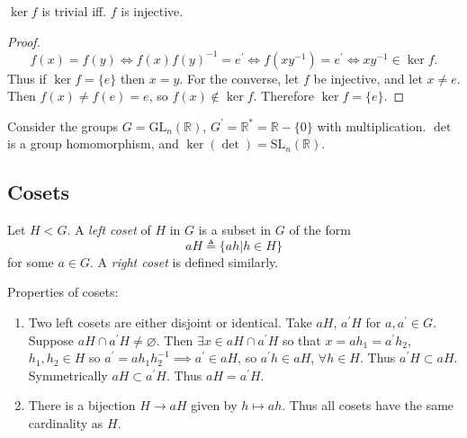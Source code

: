 \begin{prop}
$\ker f$ is trivial iff. $f$ is injective.
\end{prop}
\begin{proof}
$$
f(x) = f(y) \iff f(x) f(y)^{-1} = e^\prime
            \iff f(xy^{-1}) = e^\prime
            \iff xy^{-1} \in \ker f.
$$
Thus if $\ker f = \{ e \}$ then $x = y$. For the converse, let $f$ be
injective, and let $x \neq e$. Then $f(x) \neq f(e) = e$, so
$f(x) \notin \ker f$. Therefore $\ker f = \{ e \}$.
\end{proof}

\begin{xmpl}
Consider the groups
$G = \mathrm{GL}_n (\mathbb{R})$,
$G^\prime = \mathbb{R}^\ast = \mathbb{R} - \{0\}$ with multiplication.
$\det$ is a group homomorphism, and
$\ker(\det) = \mathrm{SL}_n(\mathbb{R})$.
\end{xmpl}

\subsection{Cosets}

\begin{defn}[Coset]
Let $H < G$. A \emph{left coset} of $H$ in $G$ is a subset in $G$ of the form
$$
aH \triangleq \{ ah | h \in H \}
$$
for some $a \in G$. A \emph{right coset} is defined similarly.
\end{defn}

\begin{remark}

Properties of cosets:
\begin{enumerate}
  \item{Two left cosets are either disjoint or identical. Take $aH$,
        $a^\prime H$ for $a, a^\prime \in G$. Suppose
        $aH \cap a^\prime H \neq \varnothing$. Then
        $\exists x \in aH \cap a^\prime H$ so that
        $x = ah_1 = a^\prime h_2$, $h_1, h_2 \in H$ so
        $a^\prime = a h_1 h_2^{-1} \implies a^\prime \in aH$,
        so $a^\prime h \in aH$, $\forall h \in H$. Thus
        $a^\prime H \subset aH$. Symmetrically
        $aH \subset a^\prime H$.
        Thus $aH = a^\prime H$.
       }
  \item{ There is a bijection $H \to aH$ given by $h \mapsto ah$. Thus
         all cosets have the same cardinality as $H$.
       }
\end{enumerate}

\end{remark}

